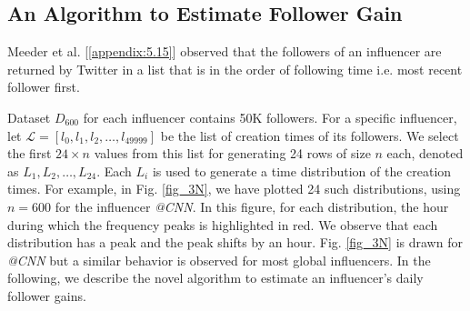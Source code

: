 \subsection{An Algorithm to Estimate Follower Gain %
}

Meeder et al. [\ref{appendix:5.15}] observed that the followers of an influencer are returned by Twitter in a list that is %
in the order of following time i.e. most recent follower first.

Dataset $D_{600}$ for each influencer contains 50K followers. For a specific influencer,  let $\mathcal{L} = [l_0, l_1, l_2, \ldots, l_{49999}]$ be the list of creation times of its followers. We select the first $24 \times n$ values from this list for generating 24 rows of size  $n$ each, denoted as $L_1, L_2, \ldots, L_{24}$. Each $L_i$ is used to generate a time distribution of the creation times. For example, in Fig. \ref{fig_3N}, we have plotted 24 such distributions, using $n = 600$ for the influencer \emph{@CNN}. In this figure, for each distribution, the hour during which the frequency peaks is highlighted in red. We observe that each distribution has a peak and the peak shifts by an hour. Fig. \ref{fig_3N} is drawn for \emph{@CNN} but a similar behavior is observed for most global influencers. In the following, we describe the novel algorithm to estimate an influencer's  daily follower gains. 

